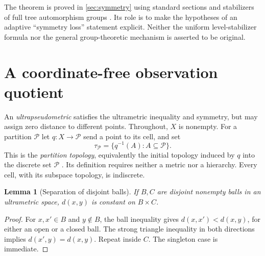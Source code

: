 \documentclass[11pt]{article}
\newtheorem{lemma}[theorem]{Lemma}
\theoremstyle{definition}
\theoremstyle{remark}
\newcommand{\PP}{\mathcal P}
\begin{document}
The theorem is proved in \cref{sec:symmetry} using standard sections and stabilizers of full tree automorphism groups \cite[Sections 1.2.2--1.2.3]{BranchGroups}. Its role is to make the hypotheses of an adaptive ``symmetry loss'' statement explicit. Neither the uniform level-stabilizer formula nor the general group-theoretic mechanism is asserted to be original.

\section{A coordinate-free observation quotient}\label{sec:quotient}
An \emph{ultrapseudometric} satisfies the ultrametric inequality and symmetry, but may assign zero distance to different points. Throughout, $X$ is nonempty. For a partition $\PP$ let $q:X\to\PP$ send a point to its cell, and set
\[
 \tau_{\PP}=\{q^{-1}(A):A\subseteq\PP\}.
\]
This is the \emph{partition topology}, equivalently the initial topology induced by $q$ into the discrete set $\PP$ \cite[Definition 1]{Iyer2012}. Its definition requires neither a metric nor a hierarchy. Every cell, with its subspace topology, is indiscrete.

\begin{lemma}[Separation of disjoint balls]\label{lem:balls}
If $B,C$ are disjoint nonempty balls in an ultrametric space, $d(x,y)$ is constant on $B\times C$.
\end{lemma}
\begin{proof}
For $x,x'\in B$ and $y\notin B$, the ball inequality gives $d(x,x')<d(x,y)$, for either an open or a closed ball. The strong triangle inequality in both directions implies $d(x',y)=d(x,y)$. Repeat inside $C$. The singleton case is immediate.
\end{proof}
\end{document}
